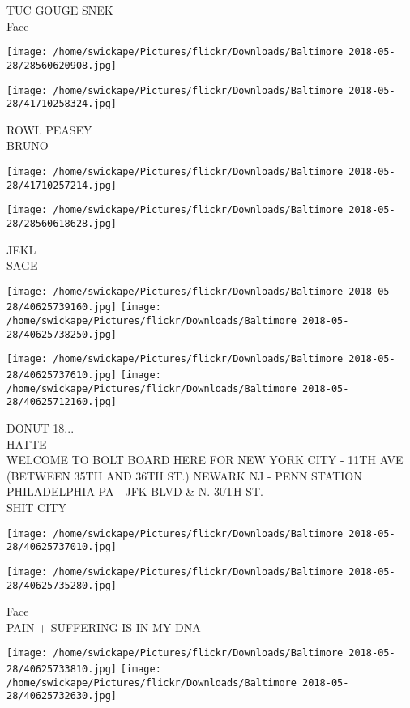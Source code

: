 \documentclass[10pt,letterpaper]{article}
\begin{document}
TUC GOUGE SNEK\\
Face
\pagebreak

\texttt{[image: /home/swickape/Pictures/flickr/Downloads/Baltimore 2018-05-28/28560620908.jpg]}

\vspace{0.25in}
\texttt{[image: /home/swickape/Pictures/flickr/Downloads/Baltimore 2018-05-28/41710258324.jpg]}

ROWL PEASEY\\
BRUNO
\pagebreak

\texttt{[image: /home/swickape/Pictures/flickr/Downloads/Baltimore 2018-05-28/41710257214.jpg]}

\vspace{0.25in}
\texttt{[image: /home/swickape/Pictures/flickr/Downloads/Baltimore 2018-05-28/28560618628.jpg]}

JEKL\\
SAGE
\pagebreak

\texttt{[image: /home/swickape/Pictures/flickr/Downloads/Baltimore 2018-05-28/40625739160.jpg]}
\texttt{[image: /home/swickape/Pictures/flickr/Downloads/Baltimore 2018-05-28/40625738250.jpg]}

\texttt{[image: /home/swickape/Pictures/flickr/Downloads/Baltimore 2018-05-28/40625737610.jpg]}
\texttt{[image: /home/swickape/Pictures/flickr/Downloads/Baltimore 2018-05-28/40625712160.jpg]}

DONUT 18...\\
HATTE\\
WELCOME TO BOLT BOARD HERE FOR NEW YORK CITY {-} 11TH AVE (BETWEEN 35TH AND 36TH ST.) NEWARK NJ {-} PENN STATION PHILADELPHIA PA {-} JFK BLVD \& N. 30TH ST.\\
SHIT CITY
\pagebreak

\texttt{[image: /home/swickape/Pictures/flickr/Downloads/Baltimore 2018-05-28/40625737010.jpg]}

\vspace{0.25in}
\texttt{[image: /home/swickape/Pictures/flickr/Downloads/Baltimore 2018-05-28/40625735280.jpg]}

Face\\
PAIN + SUFFERING IS IN MY DNA
\pagebreak

\texttt{[image: /home/swickape/Pictures/flickr/Downloads/Baltimore 2018-05-28/40625733810.jpg]}
\texttt{[image: /home/swickape/Pictures/flickr/Downloads/Baltimore 2018-05-28/40625732630.jpg]}
\end{document}
